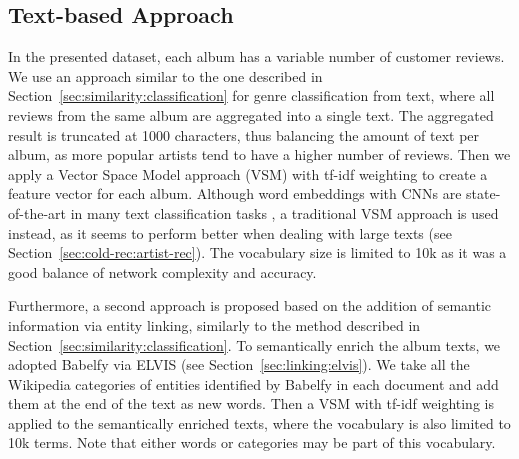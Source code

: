 \subsection{Text-based Approach}
\label{sec:multi-class:text}
In the presented dataset, each album has a variable number of customer reviews. 
We use an approach similar to the one described in Section~\ref{sec:similarity:classification} for genre classification from text, where all reviews from the same album are aggregated into a single text. 
The aggregated result is truncated at 1000 characters, thus balancing the amount of text per album, as more popular artists tend to have a higher number of reviews. %
Then we apply a Vector Space Model approach (VSM) with tf-idf weighting \citep{Zobel1998} to create a feature vector for each album. 
Although word embeddings \citep{Mikolov2013} with CNNs are state-of-the-art in many text classification tasks \citep{Kim2014}, a traditional VSM approach is used instead, as it seems to perform better when dealing with large texts (see Section~\ref{sec:cold-rec:artist-rec}).
The vocabulary size is limited to 10k as it was a good balance of network complexity and accuracy.%

Furthermore, a second approach is proposed based on the addition of semantic information via entity linking, similarly to the method described in Section~\ref{sec:similarity:classification}. 
To semantically enrich the album texts, we adopted Babelfy \citep{Moroetal2014} via ELVIS (see Section~\ref{sec:linking:elvis}).%
We take all the Wikipedia categories of entities identified by Babelfy in each document and add them at the end of the text as new words. 
Then a VSM with tf-idf weighting is applied to the semantically enriched texts, where the vocabulary is also limited to 10k terms. 
Note that either words or categories may be part of this vocabulary. 

